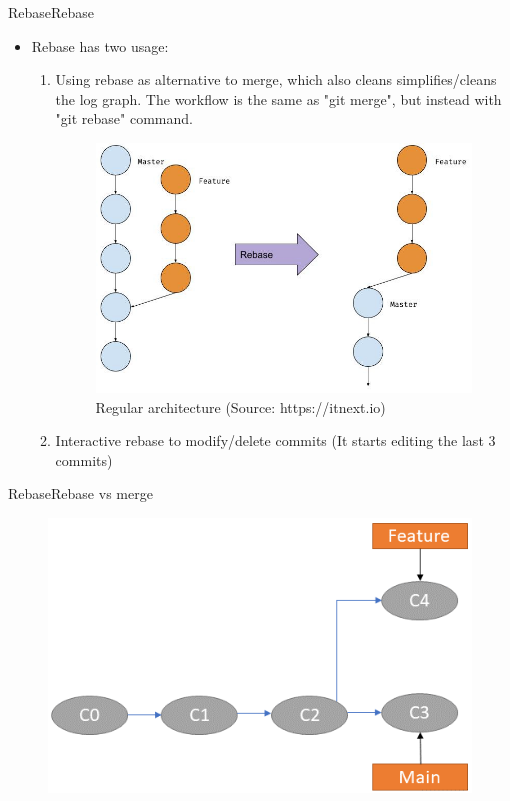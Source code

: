 \begin{frame}{Rebase}{Rebase}
\begin{itemize}
\item Rebase has two usage:
\begin{enumerate}
\item Using rebase as alternative to merge, which also cleans simplifies/cleans
the log graph. The workflow is the same as "git merge", but instead with "git rebase" command.
  \begin{figure}
    \begin{center}
    \includegraphics[width=0.4\linewidth]{pics/rebase-merge.jpeg}
    \vspace{-0.3cm}
    \caption{\footnotesize Regular architecture (Source: https://itnext.io)}
  \end{center}
\end{figure}
\item Interactive rebase to modify/delete commits
 (It starts editing the last 3 commits)
\end{enumerate}
\end{itemize}
\end{frame}

\begin{frame}{Rebase}{Rebase vs merge}
  \begin{figure}
    \begin{center}
    \includegraphics[width=0.6\linewidth]{pics/rebase-vs-merge-1.png}
    \vspace{-0.3cm}
  \end{center}
\end{figure}
\end{frame}

